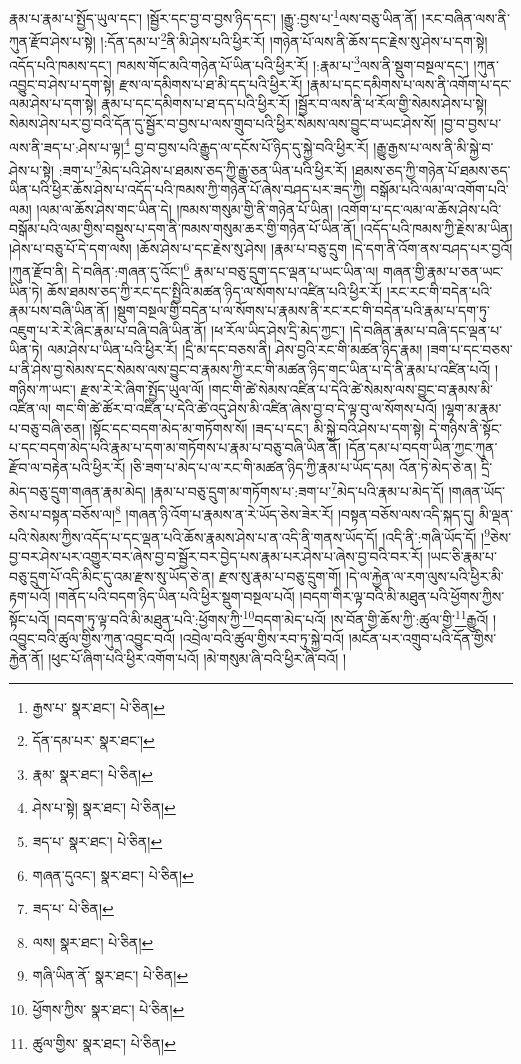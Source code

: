 རྣམ་པ་རྣམ་པ་སྤྱོད་ཡུལ་དང་། །སྦྱོར་དང་བྱ་བ་བྱས་ཉིད་དང་། །རྒྱུ་:བྱས་པ་\footnote{རྒྱས་པ་  སྣར་ཐང་།  པེ་ཅིན། }ལས་བཅུ་ཡིན་ནོ། །རང་བཞིན་ལས་ནི་ཀུན་རྫོབ་ཤེས་པ་སྟེ། །:དོན་དམ་པ་\footnote{དོན་དམ་པར་  སྣར་ཐང་། }ནི་མི་ཤེས་པའི་ཕྱིར་རོ། །གཉེན་པོ་ལས་ནི་ཆོས་དང་རྗེས་སུ་ཤེས་པ་དག་སྟེ། འདོད་པའི་ཁམས་དང་། ཁམས་གོང་མའི་གཉེན་པོ་ཡིན་པའི་ཕྱིར་རོ། །:རྣམ་པ་\footnote{རྣམ་  སྣར་ཐང་།  པེ་ཅིན། }ལས་ནི་སྡུག་བསྔལ་དང་། །ཀུན་འབྱུང་བ་ཤེས་པ་དག་སྟེ། རྫས་ལ་དམིགས་པ་ཐ་མི་དད་པའི་ཕྱིར་རོ། །རྣམ་པ་དང་དམིགས་པ་ལས་ནི་འགོག་པ་དང་ལམ་ཤེས་པ་དག་སྟེ། རྣམ་པ་དང་དམིགས་པ་ཐ་དད་པའི་ཕྱིར་རོ། །སྦྱོར་བ་ལས་ནི་ཕ་རོལ་གྱི་སེམས་ཤེས་པ་སྟེ། སེམས་ཤེས་པར་བྱ་བའི་དོན་དུ་སྦྱོར་བ་བྱས་པ་ལས་གྲུབ་པའི་ཕྱིར་སེམས་ལས་བྱུང་བ་ཡང་ཤེས་སོ། །བྱ་བ་བྱས་པ་ལས་ནི་ཟད་པ་:ཤེས་པ་ལྟ།\footnote{ཤེས་པ་སྟེ།  སྣར་ཐང་།  པེ་ཅིན། } བྱ་བ་བྱས་པའི་རྒྱུད་ལ་དངོས་པོ་ཉིད་དུ་སྐྱེ་བའི་ཕྱིར་རོ། །རྒྱུ་རྒྱས་པ་ལས་ནི་མི་སྐྱེ་བ་ཤེས་པ་སྟེ། :ཟག་པ་\footnote{ཟད་པ་  སྣར་ཐང་།  པེ་ཅིན། }མེད་པའི་ཤེས་པ་ཐམས་ཅད་ཀྱི་རྒྱུ་ཅན་ཡིན་པའི་ཕྱིར་རོ། །ཐམས་ཅད་ཀྱི་གཉེན་པོ་ཐམས་ཅད་ཡིན་པའི་ཕྱིར་ཆོས་ཤེས་པ་འདོད་པའི་ཁམས་ཀྱི་གཉེན་པོ་ཞེས་བཤད་པར་ཟད་ཀྱི། བསྒོམ་པའི་ལམ་ལ་འགོག་པའི་ལམ། །ལམ་ལ་ཆོས་ཤེས་གང་ཡིན་དེ། །ཁམས་གསུམ་གྱི་ནི་གཉེན་པོ་ཡིན། །འགོག་པ་དང་ལམ་ལ་ཆོས་ཤེས་པའི་བསྒོམ་པའི་ལམ་གྱིས་བསྡུས་པ་དག་ནི་ཁམས་གསུམ་ཆར་གྱི་གཉེན་པོ་ཡིན་ནོ། །འདོད་པའི་ཁམས་ཀྱི་རྗེས་མ་ཡིན། །ཤེས་པ་བཅུ་པོ་དེ་དག་ལས། །ཆོས་ཤེས་པ་དང་རྗེས་སུ་ཤེས། །རྣམ་པ་བཅུ་དྲུག །དེ་དག་ནི་འོག་ནས་བཤད་པར་བྱའོ། །ཀུན་རྫོབ་ནི། དེ་བཞིན་:གཞན་དུ་འོང་།\footnote{གཞན་དུའང་།  སྣར་ཐང་།  པེ་ཅིན། } རྣམ་པ་བཅུ་དྲུག་དང་ལྡན་པ་ཡང་ཡིན་ལ། གཞན་གྱི་རྣམ་པ་ཅན་ཡང་ཡིན་ཏེ། ཆོས་ཐམས་ཅད་ཀྱི་རང་དང་སྤྱིའི་མཚན་ཉིད་ལ་སོགས་པ་འཛིན་པའི་ཕྱིར་རོ། །རང་རང་གི་བདེན་པའི་རྣམ་པས་བཞི་ཡིན་ནོ། །སྡུག་བསྔལ་གྱི་བདེན་པ་ལ་སོགས་པ་རྣམས་ནི་རང་རང་གི་བདེན་པའི་རྣམ་པ་དག་ཏུ་འཇུག་པ་རེ་རེ་ཞིང་རྣམ་པ་བཞི་བཞི་ཡིན་ནོ། །ཕ་རོལ་ཡིད་ཤེས་དྲི་མེད་ཀྱང་། །དེ་བཞིན་རྣམ་པ་བཞི་དང་ལྡན་པ་ཡིན་ཏེ། ལམ་ཤེས་པ་ཡིན་པའི་ཕྱིར་རོ། །དྲི་མ་དང་བཅས་ནི། ཤེས་བྱའི་རང་གི་མཚན་ཉིད་རྣམ། །ཟག་པ་དང་བཅས་པ་ནི་ཤེས་བྱ་སེམས་དང་སེམས་ལས་བྱུང་བ་རྣམས་ཀྱི་རང་གི་མཚན་ཉིད་གང་ཡིན་པ་དེ་ནི་རྣམ་པ་འཛིན་པའོ། །གཉིས་ཀ་ཡང་། རྫས་རེ་རེ་ཞིག་སྤྱོད་ཡུལ་ལོ། །གང་གི་ཚེ་སེམས་འཛིན་པ་དེའི་ཚེ་སེམས་ལས་བྱུང་བ་རྣམས་མི་འཛིན་ལ། གང་གི་ཚེ་ཚོར་བ་འཛིན་པ་དེའི་ཚེ་འདུ་ཤེས་མི་འཛིན་ཞེས་བྱ་བ་དེ་ལྟ་བུ་ལ་སོགས་པའོ། །ལྷག་མ་རྣམ་པ་བཅུ་བཞི་ཅན། །སྟོང་དང་བདག་མེད་མ་གཏོགས་སོ། །ཟད་པ་དང་། མི་སྐྱེ་བའི་ཤེས་པ་དག་སྟེ། དེ་གཉིས་ནི་སྟོང་པ་དང་བདག་མེད་པའི་རྣམ་པ་དག་མ་གཏོགས་པ་རྣམ་པ་བཅུ་བཞི་ཡིན་ནོ། །དོན་དམ་པ་བདག་ཡིན་ཀྱང་ཀུན་རྫོབ་ལ་བརྟེན་པའི་ཕྱིར་རོ། །ཅི་ཟག་པ་མེད་པ་ལ་རང་གི་མཚན་ཉིད་ཀྱི་རྣམ་པ་ཡོད་དམ། འོན་ཏེ་མེད་ཅེ་ན། དྲི་མེད་བཅུ་དྲུག་གཞན་རྣམ་མེད། །རྣམ་པ་བཅུ་དྲུག་མ་གཏོགས་པ་:ཟག་པ་\footnote{ཟད་པ་  པེ་ཅིན། }མེད་པའི་རྣམ་པ་མེད་དོ། །གཞན་ཡོད་ཅེས་པ་བསྟན་བཅོས་ལ།\footnote{ལས།  སྣར་ཐང་།  པེ་ཅིན། } །གཞན་ཉི་འོག་པ་རྣམས་ན་རེ་ཡོད་ཅེས་ཟེར་རོ། །བསྟན་བཅོས་ལས་འདི་སྐད་དུ། མི་ལྡན་པའི་སེམས་ཀྱིས་འདོད་པ་དང་ལྡན་པའི་ཆོས་རྣམས་ཤེས་པ་ན་འདི་ནི་གནས་ཡོད་དོ། །འདི་ནི་:གཞི་ཡོད་དོ། །\footnote{གཞི་ཡིན་ནོ་  སྣར་ཐང་།  པེ་ཅིན། }ཅེས་བྱ་བར་ཤེས་པར་འགྱུར་བར་ཞེས་བྱ་བ་སྦྱོར་བར་བྱེད་པས་རྣམ་པར་ཤེས་པ་ཞེས་བྱ་བའི་བར་རོ། །ཡང་ཅི་རྣམ་པ་བཅུ་དྲུག་པོ་འདི་མིང་དུ་འམ་རྫས་སུ་ཡོད་ཅེ་ན། རྫས་སུ་རྣམ་པ་བཅུ་དྲུག་གོ། །དེ་ལ་རྐྱེན་ལ་རག་ལུས་པའི་ཕྱིར་མི་རྟག་པའོ། །གནོད་པའི་བདག་ཉིད་ཡིན་པའི་ཕྱིར་སྡུག་བསྔལ་པའོ། །བདག་གིར་ལྟ་བའི་མི་མཐུན་པའི་ཕྱོགས་ཀྱིས་སྟོང་པའོ། །བདག་ཏུ་ལྟ་བའི་མི་མཐུན་པའི་:ཕྱོགས་ཀྱི་\footnote{ཕྱོགས་ཀྱིས་  སྣར་ཐང་།  པེ་ཅིན། }བདག་མེད་པའོ། །ས་བོན་གྱི་ཆོས་ཀྱི་:ཚུལ་གྱི་\footnote{ཚུལ་གྱིས་  སྣར་ཐང་།  པེ་ཅིན། }རྒྱུའོ། །འབྱུང་བའི་ཚུལ་གྱིས་ཀུན་འབྱུང་བའོ། །འབྲེལ་བའི་ཚུལ་གྱིས་རབ་ཏུ་སྐྱེ་བའོ། །མངོན་པར་འགྲུབ་པའི་དོན་གྱིས་རྐྱེན་ནོ། །ཕུང་པོ་ཞིག་པའི་ཕྱིར་འགོག་པའོ། །མེ་གསུམ་ཞི་བའི་ཕྱིར་ཞི་བའོ། །
